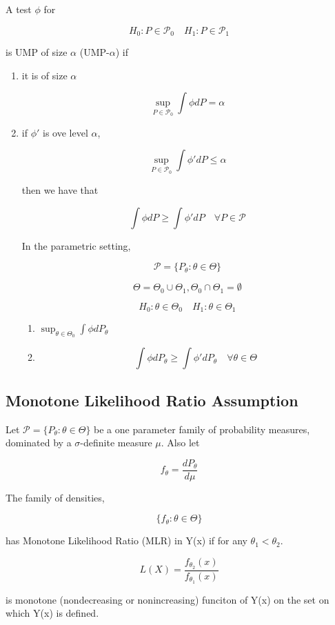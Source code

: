 \documentclass[11pt,fleqn]{book} %
\begin{document}
 \begin{definition}
 	A test $\phi$ for 

 	 		$$H_0: P \in \mathcal{P}_0 \quad H_1: P \in \mathcal{P}_1 $$

is UMP of size $\alpha$ (UMP-$\alpha$) if 

		\begin{enumerate}
			\item it is of size $\alpha$ 

					$$\sup_{P \in \mathcal{P}_0} \int \phi dP = \alpha $$

			\item if $\phi'$ is ove level $\alpha$, 

					$$\sup_{P \in \mathcal{P}_0} \int \phi' dP \leq \alpha $$

		then we have that

				$$\int \phi dP \geq \int \phi' dP \quad \forall P \in \mathcal{P} $$

		In the parametric setting, 

				$$\mathcal{P} = \{P_\theta : \theta \in \Theta\} $$

				$$\Theta = \Theta_0 \cup \Theta_1, \Theta_0 \cap \Theta_1 = \emptyset $$

				$$H_0: \theta \in \Theta_0 \quad H_1: \theta \in \Theta_1 $$

			\begin{enumerate}
				\item $\sup_{\theta \in \Theta_0} \int \phi d P_\theta$
				\item $$\int \phi dP_\theta \geq \int \phi' dP_\theta \quad \forall \theta \in \Theta $$
			\end{enumerate}
		\end{enumerate}
 \end{definition}


 \subsection{Monotone Likelihood Ratio Assumption}

 \begin{definition}
 	Let $\mathcal{P} = \{P_\theta: \theta \in \Theta \}$ be a one parameter family of probability measures, dominated by a $\sigma$-definite measure $\mu$. Also let 

 			$$f_\theta = \frac{d P_\theta}{d \mu} $$

 	The family of densities, 

 			$$\{f_\theta: \theta \in \Theta\} $$

 	has Monotone Likelihood Ratio (MLR) in Y(x) if for any $\theta_1 < \theta_2$. 

 			$$L(X) = \frac{f_{\theta_2}(x)}{f_{\theta_1}(x)} $$

 	is monotone (nondecreasing or nonincreasing) funciton of Y(x) on the set on which Y(x) is defined. 
 \end{definition}
\end{document}
